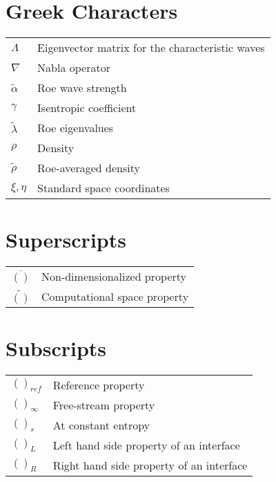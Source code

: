 \section*{Greek Characters}
\begin{longtable}{ll}
$\Lambda$ & Eigenvector matrix for the characteristic waves \\
$\nabla$ & Nabla operator \\
$\tilde{\alpha}$ & Roe wave strength \\
$\gamma$ & Isentropic coefficient \\
$\tilde{\lambda}$ & Roe eigenvalues \\
$\rho$ & Density \\
$\tilde{\rho}$ & Roe-averaged density \\
$\xi, \eta$ & Standard space coordinates \\
\end{longtable}

\section*{Superscripts}
\begin{longtable}{ll}
$\overline{()}$ & Non-dimensionalized property \\
$\tilde{()}$ & Computational space property \\
\end{longtable}

\section*{Subscripts}
\begin{longtable}{ll}
$()_{ref}$ & Reference property \\
$()_{\infty}$ & Free-stream property \\
$()_{s}$ & At constant entropy \\
$()_L$ & Left hand side property of an interface \\
$()_R$ & Right hand side property of an interface \\
\end{longtable}

